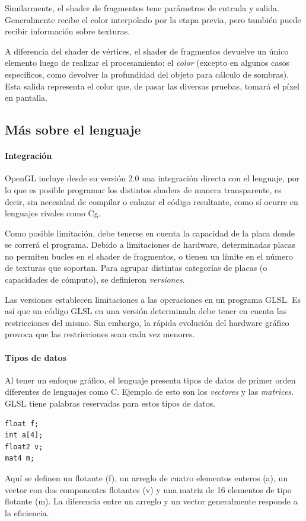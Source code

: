 Similarmente, el shader de fragmentos tene par\'ametros de entrada y salida.
Generalmente recibe el color interpolado por la etapa previa, pero tambi\'en puede recibir informaci\'on sobre texturas. 

A diferencia del shader de vértices, el shader de fragmentos devuelve un único elemento luego de realizar el procesamiento: el {\em color} (excepto en algunos casos específicos, como devolver la profundidad del objeto para cálculo de sombras).
Esta salida representa el color que, de pasar las diversas pruebas, tomar\'a el p\'ixel en pantalla.

\subsection{M\'as sobre el lenguaje}
\paragraph{Integración}
OpenGL incluye desde su versión 2.0 una integración directa con el lenguaje, por lo que es posible programar los distintos shaders de manera transparente, es decir, sin necesidad de compilar o enlazar el código resultante, como sí ocurre en lenguajes rivales como Cg.

Como posible limitación, debe tenerse en cuenta la capacidad de la placa donde se correrá el programa.
Debido a limitaciones de hardware, determinadas placas no permiten bucles en el shader de fragmentos, o tienen un límite en el número de texturas que soportan.
Para agrupar distintas categorías de placas (o capacidades de cómputo), se definieron {\em versiones}.

Las versiones establecen limitaciones a las operaciones en un programa GLSL.
Es as\'i que un código GLSL en una versión determinada debe tener en cuenta las restricciones del mismo.
Sin embargo, la r\'apida evoluci\'on del hardware gr\'afico provoca que las restricciones sean cada vez menores.

\paragraph{Tipos de datos}
Al tener un enfoque gr\'afico, el lenguaje presenta tipos de datos de primer orden diferentes de lenguajes como C. Ejemplo de esto son los {\em vectores} y las {\em matrices}.
GLSL tiene palabras reservadas para estos tipos de datos.
\begin{verbatim}
float f;
int a[4];
float2 v;
mat4 m;
\end{verbatim}
Aqu\'i se definen un flotante (f), un arreglo de cuatro elementos enteros (a), un vector con dos componentes flotantes (v) y una matriz de 16 elementos de tipo flotante (m).
La diferencia entre un arreglo y un vector generalmente responde a la eficiencia.

